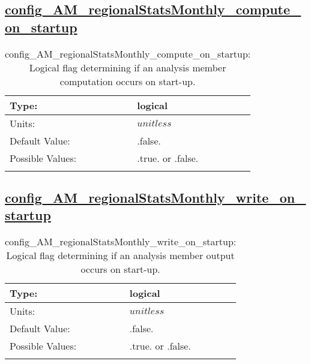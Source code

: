 \subsection[config\_AM\_regionalStatsMonthly\_compute\_on\_startup]{\hyperref[sec:nm_tab_AM_regionalStatsMonthly]{config\_AM\_regionalStatsMonthly\_compute\_on\_startup}}
\label{subsec:nm_sec_config_AM_regionalStatsMonthly_compute_on_startup}
\begin{center}
\begin{longtable}{| p{2.0in} || p{4.0in} |}
    \hline
    Type: & logical \\
    \hline
    Units: & $unitless$ \\
    \hline
    Default Value: & .false. \\
    \hline
    Possible Values: & .true. or .false. \\
    \hline
    \caption{config\_AM\_regionalStatsMonthly\_compute\_on\_startup: Logical flag determining if an analysis member computation occurs on start-up.}
\end{longtable}
\end{center}
\subsection[config\_AM\_regionalStatsMonthly\_write\_on\_startup]{\hyperref[sec:nm_tab_AM_regionalStatsMonthly]{config\_AM\_regionalStatsMonthly\_write\_on\_startup}}
\label{subsec:nm_sec_config_AM_regionalStatsMonthly_write_on_startup}
\begin{center}
\begin{longtable}{| p{2.0in} || p{4.0in} |}
    \hline
    Type: & logical \\
    \hline
    Units: & $unitless$ \\
    \hline
    Default Value: & .false. \\
    \hline
    Possible Values: & .true. or .false. \\
    \hline
    \caption{config\_AM\_regionalStatsMonthly\_write\_on\_startup: Logical flag determining if an analysis member output occurs on start-up.}
\end{longtable}
\end{center}
